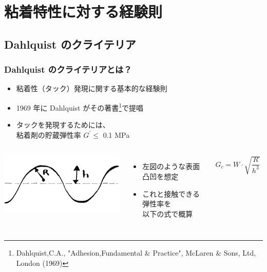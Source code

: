 \documentclass[unicode,12pt]{beamer}%
\begin{document}
\section{粘着特性に対する経験則}
\subsection{Dahlquist のクライテリア}
\setcounter{footnote}{0}
\begin{frame}
	\frametitle{Dahlquist のクライテリアとは？}
			\begin{itemize}
				\item 粘着性（タック）発現に関する基本的な経験則
				\item 1969 年に Dahlquist がその著書\footnote{Dahlquist,C.A., "Adhesion,Fundamental \& Practice", McLaren \& Sons, Ltd, London (1969)}で提唱
				\item タックを発現するためには、\\\alert{粘着剤の貯蔵弾性率 $G^{\prime} \leq$ 0.1 MPa }
			\end{itemize}

			\begin{columns}[c, onlytextwidth]
						\centering
							\includegraphics[width=\textwidth]{Dahlquist.png}
					\begin{itemize}
						\item 左図のような表面凸凹を想定
						\item これと接触できる弾性率を\\以下の式で概算
					\end{itemize}

					\vspace{-6mm}
					\begin{align*}
						G_c = W \cdot \sqrt{\dfrac{R}{h^3}}
					\end{align*}
			\end{columns}
\end{frame}
\end{document}
